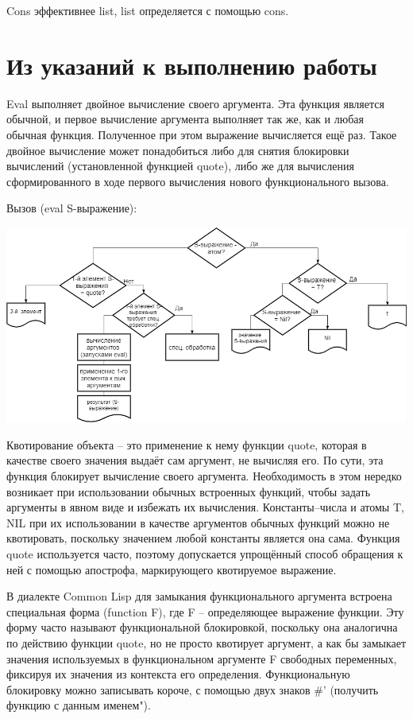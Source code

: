\documentclass[12pt]{report}
\begin{document}
Cons эффективнее list, list определяется с помощью cons.

 

\section*{Из указаний  к выполнению работы}

Eval выполняет двойное  вычисление своего аргумента. Эта функция является обычной, и первое  вычисление аргумента выполняет так же, как и любая обычная функция.  Полученное при этом выражение вычисляется ещё раз. Такое двойное  вычисление может понадобиться либо для снятия блокировки вычислений (установленной функцией quote), либо же для вычисления сформированного в ходе первого вычисления нового функционального вызова.

\clearpage
Вызов (eval S-выражение):

\includegraphics[scale=0.5]{img/eval}



Квотирование объекта -- это применение к нему функции quote, которая в качестве своего значения выдаёт сам аргумент, не вычисляя его. По сути, эта функция блокирует вычисление своего аргумента. Необходимость в этом нередко возникает при использовании обычных встроенных функций, чтобы задать аргументы в явном виде и избежать их вычисления. Константы–числа и атомы T, NIL при их  использовании в качестве аргументов обычных функций можно не  квотировать, поскольку значением любой константы является она сама. Функция quote используется часто, поэтому допускается упрощённый способ обращения к ней с помощью апострофа, маркирующего квотируемое выражение.


В диалекте Common Lisp для замыкания функционального аргумента встроена специальная форма (function F), где F – определяющее  выражение функции. Эту форму часто называют функциональной  блокировкой, поскольку она аналогична по действию функции quote, но  не просто квотирует аргумент, а как бы замыкает значения используемых  в функциональном аргументе F свободных переменных, фиксируя их значения из контекста его определения. Функциональную блокировку  можно записывать короче, с помощью двух знаков \#' (получить функцию с данным именем").
\end{document}
